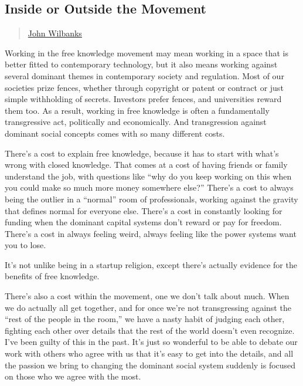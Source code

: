 \subsection{Inside or Outside the
Movement}\label{inside-or-outside-the-movement}

\begin{quote}
\hyperlink{john-wilbanks}{John Wilbanks}
\end{quote}

Working in the free knowledge movement may mean working in a space that
is better fitted to contemporary technology, but it also means working
against several dominant themes in contemporary society and regulation.
Most of our societies prize fences, whether through copyright or patent
or contract or just simple withholding of secrets. Investors prefer
fences, and universities reward them too. As a result, working in free
knowledge is often a fundamentally transgressive act, politically and
economically. And transgression against dominant social concepts comes
with so many different costs.

There's a cost to explain free knowledge, because it has to start with
what's wrong with closed knowledge. That comes at a cost of having
friends or family understand the job, with questions like ``why do you
keep working on this when you could make so much more money somewhere
else?'' There's a cost to always being the outlier in a ``normal'' room
of professionals, working against the gravity that defines normal for
everyone else. There's a cost in constantly looking for funding when the
dominant capital systems don't reward or pay for freedom. There's a cost
in always feeling weird, always feeling like the power systems want you
to lose.

It's not unlike being in a startup religion, except there's actually
evidence for the benefits of free knowledge.

There's also a cost within the movement, one we don't talk about much.
When we do actually all get together, and for once we're not
transgressing against the ``rest of the people in the room,'' we have a
nasty habit of judging each other, fighting each other over details that
the rest of the world doesn't even recognize. I've been guilty of this
in the past. It's just so wonderful to be able to debate our work with
others who agree with us that it's easy to get into the details, and all
the passion we bring to changing the dominant social system suddenly is
focused on those who we agree with the most.


